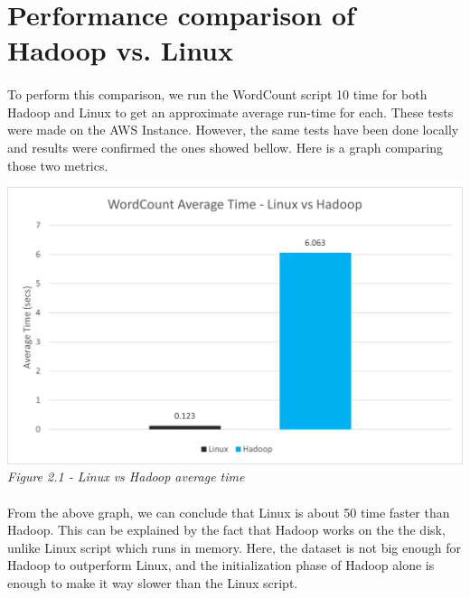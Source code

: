 \section{Performance comparison of Hadoop vs. Linux} \label{T2}

\paragraph{}To perform this comparison, we run the WordCount script 10 time for both Hadoop and Linux to get an approximate average run-time for each. These tests were made on the AWS Instance. However, the same tests have been done locally and results were confirmed the ones showed bellow. Here is a graph comparing those two metrics.
\begin{center}
\includegraphics[width=14cm]{Resources/linux_vs_hadoop.png}\\
\emph{Figure 2.1 - Linux vs Hadoop average time}
\end{center}
\paragraph{}From the above graph, we can conclude that Linux is about 50 time faster than Hadoop. This can be explained by the fact that Hadoop works on the the disk, unlike Linux script which runs in memory. Here, the dataset is not big enough for Hadoop to outperform Linux, and the initialization phase of Hadoop alone is enough to make it way slower than the Linux script.
